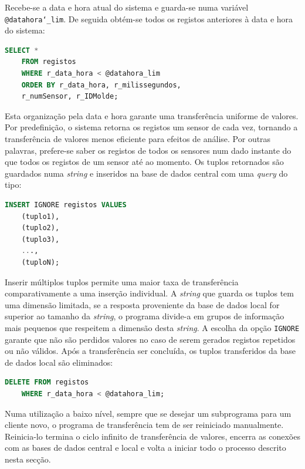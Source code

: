\documentclass[11pt,twoside,a4paper]{report}
\begin{document}
Recebe-se a data e hora atual do sistema e guarda-se numa variável \texttt{@datahora\char`_lim}. De seguida obtém-se todos os registos anteriores à data e hora do sistema:
\begin{lstlisting}[language = SQL]
	SELECT *
	FROM registos
	WHERE r_data_hora < @datahora_lim
	ORDER BY r_data_hora, r_milissegundos,
	r_numSensor, r_IDMolde;
\end{lstlisting}
Esta organização pela data e hora garante uma transferência uniforme de valores. Por predefinição, o sistema retorna os registos um sensor de cada vez, tornando a transferência de valores menos eficiente para efeitos de análise. Por outras palavras, prefere-se saber os registos de todos os sensores num dado instante do que todos os registos de um sensor até ao momento. Os tuplos retornados são guardados numa \textit{string} e inseridos na base de dados central com uma \textit{query} do tipo:
\begin{lstlisting}[language = SQL]
	INSERT IGNORE registos VALUES
	(tuplo1),
	(tuplo2),
	(tuplo3),
	...,
	(tuploN);
\end{lstlisting}
Inserir múltiplos tuplos permite uma maior taxa de transferência comparativamente a uma inserção individual. A \textit{string} que guarda os tuplos tem uma dimensão limitada, se a resposta proveniente da base de dados local for superior ao tamanho da \textit{string}, o programa divide-a em grupos de informação mais pequenos que respeitem a dimensão desta \textit{string}. A escolha da opção \texttt{IGNORE} garante que não são perdidos valores no caso de serem gerados registos repetidos ou não válidos. Após a transferência ser concluída, os tuplos transferidos da base de dados local são eliminados:
\begin{lstlisting}[language = SQL]
	DELETE FROM registos
	WHERE r_data_hora < @datahora_lim;
\end{lstlisting}
Numa utilização a baixo nível, sempre que se desejar um subprograma para um cliente novo, o programa de transferência tem de ser reiniciado manualmente. Reinicia-lo termina o ciclo infinito de transferência de valores, encerra as conexões com as bases de dados central e local e volta a iniciar todo o processo descrito nesta secção.
\end{document}
